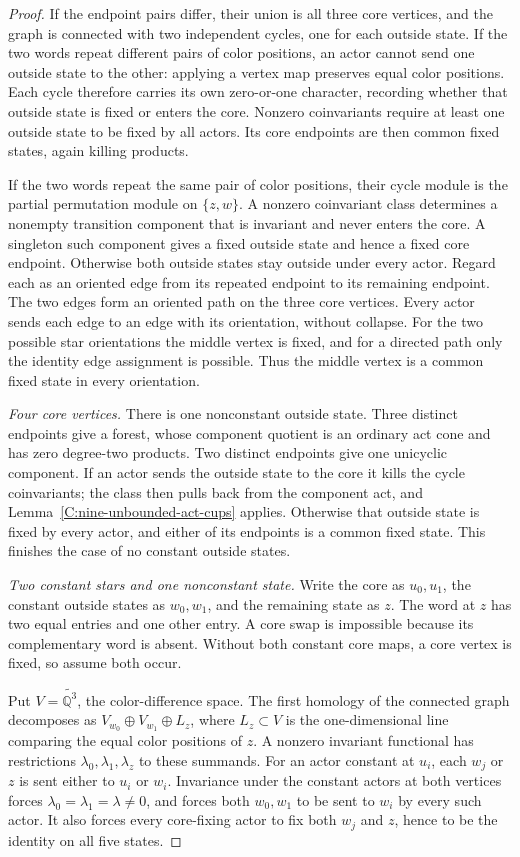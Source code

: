 \begin{proof}
If the endpoint pairs differ, their union is all three
core vertices, and the graph is connected with two
independent cycles, one for each outside state. If the
two words repeat different pairs of color positions, an
actor cannot send one outside state to the other: applying
a vertex map preserves equal color positions. Each cycle
therefore carries its own zero-or-one character, recording
whether that outside state is fixed or enters the core.
Nonzero coinvariants require at least one outside state
to be fixed by all actors. Its core endpoints are then
common fixed states, again killing products.

If the two words repeat the same pair of color positions,
their cycle module is the partial permutation module on
$\{z,w\}$. A nonzero coinvariant class determines a
nonempty transition component that is invariant and never
enters the core. A singleton such component gives a fixed
outside state and hence a fixed core endpoint.
Otherwise both outside states stay outside under every
actor. Regard each as an oriented edge from its repeated
endpoint to its remaining endpoint. The two edges form
an oriented path on the three core vertices. Every actor
sends each edge to an edge with its orientation, without
collapse. For the two possible star orientations the
middle vertex is fixed, and for a directed path only the
identity edge assignment is possible. Thus the middle
vertex is a common fixed state in every orientation.

\emph{Four core vertices.}
There is one nonconstant outside state. Three distinct
endpoints give a forest, whose component quotient is an
ordinary act cone and has zero degree-two products.
Two distinct endpoints give one unicyclic component.
If an actor sends the outside state to the core it kills
the cycle coinvariants; the class then pulls back from
the component act, and Lemma~\ref{C:nine-unbounded-act-cups}
applies. Otherwise that outside state is fixed by every
actor, and either of its endpoints is a common fixed state.
This finishes the case of no constant outside states.

\emph{Two constant stars and one nonconstant state.}
Write the core as $u_0,u_1$, the constant outside states
as $w_0,w_1$, and the remaining state as $z$.
The word at $z$ has two equal entries and one other entry.
A core swap is impossible because its complementary word
is absent. Without both constant core maps, a core vertex
is fixed, so assume both occur.

Put $V=\widetilde{\mathbb Q^3}$, the color-difference space.
The first homology of the connected graph decomposes as
$V_{w_0}\oplus V_{w_1}\oplus L_z$, where $L_z\subset V$
is the one-dimensional line comparing the equal color
positions of $z$. A nonzero invariant functional has
restrictions $\lambda_0,\lambda_1,\lambda_z$ to these
summands. For an actor constant at $u_i$, each $w_j$ or
$z$ is sent either to $u_i$ or $w_i$.
Invariance under the constant actors at both vertices
forces $\lambda_0=\lambda_1=\lambda\ne0$, and forces
both $w_0,w_1$ to be sent to $w_i$ by every such actor.
It also forces every core-fixing actor to fix both $w_j$
and $z$, hence to be the identity on all five states.


\end{proof}
